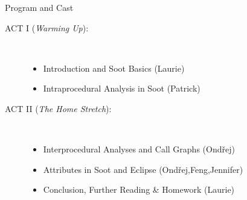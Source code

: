 \begin{slide}{Program and Cast}
\begin{description}
\item[ACT I ({\em Warming Up}):] \hspace{1in} \\
\begin{itemize}
\item Introduction and Soot Basics {\blue (Laurie)}
\item Intraprocedural Analysis in Soot {\blue (Patrick)}
\end{itemize}
\item[ACT II ({\em The Home Stretch}):] \hspace{1in} \\
\begin{itemize}
\item Interprocedural Analyses and Call Graphs {\blue (Ond\v{r}ej)}
\item Attributes in Soot and Eclipse {\blue (Ond\v{r}ej,Feng,Jennifer)}
\item {\red Conclusion, Further Reading \& Homework {\blue (Laurie)}}
\end{itemize}
\end{description}
\end{slide}

